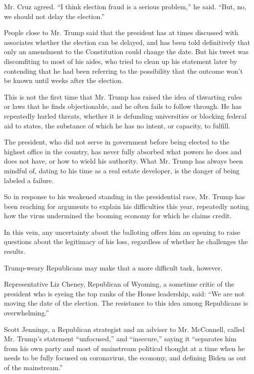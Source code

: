 Mr. Cruz agreed. ``I think election fraud is a serious problem,'' he
said. ``But, no, we should not delay the election.''

People close to Mr. Trump said that the president has at times discussed
with associates whether the election can be delayed, and has been told
definitively that only an amendment to the Constitution could change the
date. But his tweet was discomfiting to most of his aides, who tried to
clean up his statement later by contending that he had been referring to
the possibility that the outcome won't be known until weeks after the
election.

This is not the first time that Mr. Trump has raised the idea of
thwarting rules or laws that he finds objectionable, and he often fails
to follow through. He has repeatedly hurled threats, whether it is
defunding universities or blocking federal aid to states, the substance
of which he has no intent, or capacity, to fulfill.

The president, who did not serve in government before being elected to
the highest office in the country, has never fully absorbed what powers
he does and does not have, or how to wield his authority. What Mr. Trump
has always been mindful of, dating to his time as a real estate
developer, is the danger of being labeled a failure.

So in response to his weakened standing in the presidential race, Mr.
Trump has been reaching for arguments to explain his difficulties this
year, repeatedly noting how the virus undermined the booming economy for
which he claims credit.

In this vein, any uncertainty about the balloting offers him an opening
to raise questions about the legitimacy of his loss, regardless of
whether he challenges the results.

Trump-weary Republicans may make that a more difficult task, however.

Representative Liz Cheney, Republican of Wyoming, a sometime critic of
the president who is eyeing the top ranks of the House leadership, said:
``We are not moving the date of the election. The resistance to this
idea among Republicans is overwhelming.''

Scott Jennings, a Republican strategist and an adviser to Mr. McConnell,
called Mr. Trump's statement ``unfocused,'' and ``insecure,'' saying it
``separates him from his own party and most of mainstream political
thought at a time when he needs to be fully focused on coronavirus, the
economy, and defining Biden as out of the mainstream.''

